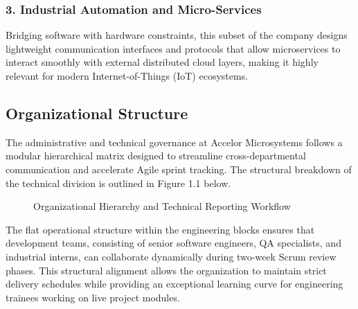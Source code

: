 \documentclass[12pt, a4paper, oneside]{report}
\begin{document}
\subsubsection{3. Industrial Automation and Micro-Services}
Bridging software with hardware constraints, this subset of the company designs lightweight communication interfaces and protocols that allow microservices to interact smoothly with external distributed cloud layers, making it highly relevant for modern Internet-of-Things (IoT) ecosystems.

\subsection{Organizational Structure}

The administrative and technical governance at Accelor Microsystems follows a modular hierarchical matrix designed to streamline cross-departmental communication and accelerate Agile sprint tracking. The structural breakdown of the technical division is outlined in Figure 1.1 below.

\begin{figure}[H]
\centering
{}
\caption{Organizational Hierarchy and Technical Reporting Workflow}
\label{fig:org_structure}
\end{figure}

The flat operational structure within the engineering blocks ensures that development teams, consisting of senior software engineers, QA specialists, and industrial interns, can collaborate dynamically during two-week Scrum review phases. This structural alignment allows the organization to maintain strict delivery schedules while providing an exceptional learning curve for engineering trainees working on live project modules.
\end{document}
